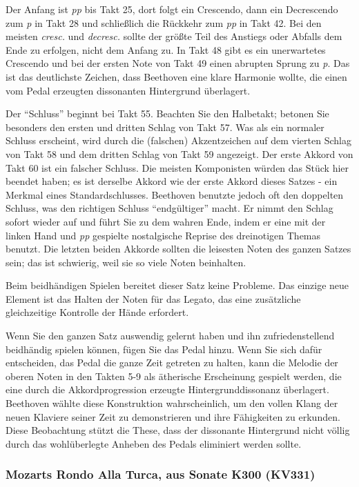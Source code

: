 Der Anfang ist \textit{pp} bis Takt 25, dort folgt ein Crescendo, dann ein Decrescendo zum \textit{p} in Takt 28 und schließlich die Rückkehr zum \textit{pp} in Takt 42.
Bei den meisten \textit{cresc.} und \textit{decresc.} sollte der größte Teil des Anstiegs oder Abfalls dem Ende zu erfolgen, nicht dem Anfang zu.
In Takt 48 gibt es ein unerwartetes Crescendo und bei der ersten Note von Takt 49 einen abrupten Sprung zu \textit{p}.
Das ist das deutlichste Zeichen, dass Beethoven eine klare Harmonie wollte, die einen vom Pedal erzeugten dissonanten Hintergrund überlagert.

Der \enquote{Schluss} beginnt bei Takt 55.
Beachten Sie den Halbetakt; betonen Sie besonders den ersten und dritten Schlag von Takt 57.
Was als ein normaler Schluss erscheint, wird durch die (falschen) Akzentzeichen auf dem vierten Schlag von Takt 58 und dem dritten Schlag von Takt 59 angezeigt.
Der erste Akkord von Takt 60 ist ein falscher Schluss.
Die meisten Komponisten würden das Stück hier beendet haben; es ist derselbe Akkord wie der erste Akkord dieses Satzes - ein Merkmal eines Standardschlusses.
Beethoven benutzte jedoch oft den doppelten Schluss, was den richtigen Schluss \enquote{endgültiger} macht.
Er nimmt den Schlag sofort wieder auf und führt Sie zu dem wahren Ende, indem er eine mit der linken Hand und \textit{pp} gespielte nostalgische Reprise des dreinotigen Themas benutzt.
Die letzten beiden Akkorde sollten die leisesten Noten des ganzen Satzes sein; das ist schwierig, weil sie so viele Noten beinhalten.

Beim beidhändigen Spielen bereitet dieser Satz keine Probleme.
Das einzige neue Element ist das Halten der Noten für das Legato, das eine zusätzliche gleichzeitige Kontrolle der Hände erfordert.

Wenn Sie den ganzen Satz auswendig gelernt haben und ihn zufriedenstellend beidhändig spielen können, fügen Sie das Pedal hinzu.
Wenn Sie sich dafür entscheiden, das Pedal die ganze Zeit getreten zu halten, kann die Melodie der oberen Noten in den Takten 5-9 als ätherische Erscheinung gespielt werden, die eine durch die Akkordprogression erzeugte Hintergrunddissonanz überlagert.
Beethoven wählte diese Konstruktion wahrscheinlich, um den vollen Klang der neuen Klaviere seiner Zeit zu demonstrieren und ihre Fähigkeiten zu erkunden.
Diese Beobachtung stützt die These, dass der dissonante Hintergrund nicht völlig durch das wohlüberlegte Anheben des Pedals eliminiert werden sollte.


\subsubsection{Mozarts Rondo Alla Turca, aus Sonate K300 (KV331)}
\label{c1ii25c}

